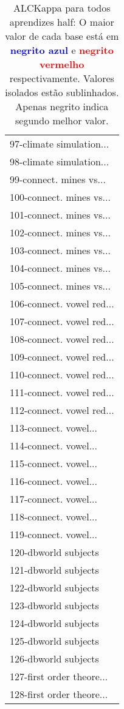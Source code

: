 \begin{table}[h]
\caption{ALCKappa para todos aprendizes half: O maior valor de cada base está em \textcolor{blue}{\textbf{negrito azul}} e \textcolor{red}{\textbf{negrito vermelho}} respectivamente. Valores isolados estão sublinhados. Apenas negrito indica segundo melhor valor.}
\begin{center}\begin{tabular}{l}
 & \\ \hline 97-climate simulation... &  \\
98-climate simulation... &  \\
99-connect. mines vs... &  \\
100-connect. mines vs... &  \\
101-connect. mines vs... &  \\
102-connect. mines vs... &  \\
103-connect. mines vs... &  \\ \hline
104-connect. mines vs... &  \\
105-connect. mines vs... &  \\
106-connect. vowel red... &  \\
107-connect. vowel red... &  \\
108-connect. vowel red... &  \\
109-connect. vowel red... &  \\
110-connect. vowel red... &  \\ \hline
111-connect. vowel red... &  \\
112-connect. vowel red... &  \\
113-connect. vowel... &  \\
114-connect. vowel... &  \\
115-connect. vowel... &  \\
116-connect. vowel... &  \\
117-connect. vowel... &  \\ \hline
118-connect. vowel... &  \\
119-connect. vowel... &  \\
120-dbworld subjects &  \\
121-dbworld subjects &  \\
122-dbworld subjects &  \\
123-dbworld subjects &  \\
124-dbworld subjects &  \\ \hline
125-dbworld subjects &  \\
126-dbworld subjects &  \\
127-first order theore... &  \\
128-first order theore... &  \\\end{tabular}\label{stratsALCKappa3AllReduxHalfb}
\end{center}
\end{table}
